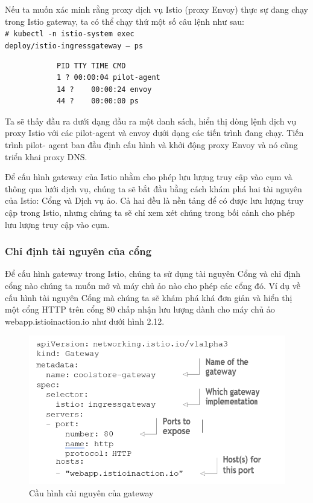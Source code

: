 \documentclass[12pt,a4paper]{report}
\newcommand{\shellcmd}[1]{\\\indent\indent\texttt{\footnotesize\# #1}\\}
\begin{document}
		Nếu ta muốn xác minh rằng proxy dịch vụ Istio (proxy Envoy) thực sự đang chạy trong Istio gateway, ta có thể chạy thứ một số câu lệnh như sau:
		\shellcmd{kubectl -n istio-system exec \ \\
			deploy/istio-ingressgateway -- ps}
		\begin{verbatim}
			PID TTY	TIME CMD
			1 ?	00:00:04 pilot-agent
			14 ?	00:00:24 envoy
			44 ?	00:00:00 ps
		\end{verbatim}
	
		Ta sẽ thấy đầu ra dưới dạng đầu ra một danh sách, hiển thị dòng lệnh dịch vụ proxy Istio với các pilot-agent và envoy dưới dạng các tiến trình đang chạy. Tiến trình pilot- agent ban đầu định cấu hình và khởi động proxy Envoy và nó cũng triển khai proxy DNS.
		
		Để cấu hình gateway của Istio nhằm cho phép lưu lượng truy cập vào cụm và thông qua lưới dịch vụ, chúng ta sẽ bắt đầu bằng cách khám phá hai tài nguyên của Istio: Cổng và Dịch vụ ảo. Cả hai đều là nền tảng để có được lưu lượng truy cập trong Istio, nhưng chúng ta sẽ chỉ xem xét chúng trong bối cảnh cho phép lưu lượng truy cập vào cụm.
		
			\subsubsection{Chỉ định tài nguyên của cổng}
		
		\hspace{0.6cm}Để cấu hình gateway trong Istio, chúng ta sử dụng tài nguyên Cổng và chỉ định cổng nào chúng ta muốn mở và máy chủ ảo nào cho phép các cổng đó. Ví dụ về cấu hình tài nguyên Cổng mà chúng ta sẽ khám phá khá đơn giản và hiển thị một cổng HTTP trên cổng 80 chấp nhận lưu lượng dành cho máy chủ ảo webapp.istioinaction.io như dưới hình 2.12.
		
		\begin{figure}[h]
			\centering
			\includegraphics[width=0.7\linewidth]{Pics/2.2.1-p3}
			\caption{Cầu hình cài nguyên của gateway}
			\label{fig:2.2.1-3}
		\end{figure}
		
\end{document}
